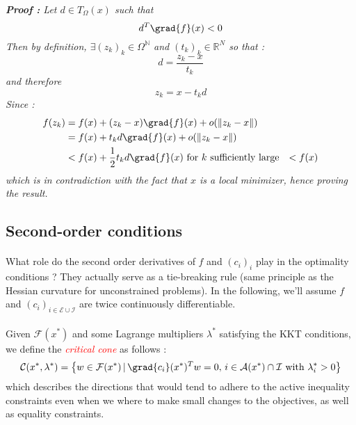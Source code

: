 \documentclass[a4paper]{article}
\begin{document}
{{			\hfill
			\begin{minipage}{0.9\linewidth}
			{
				\it
				\textbf{Proof : } 
				Let $d\in T_\Omega(x)$ such that 
				\begin{equation}
					d^T\grad{f}(x) < 0 
				\end{equation}
				Then by definition, $\exists (z_k)_k\in\Omega^{\mathbb{N}}$ and $(t_k)_k\in\mathbb{R}^N$ so that : 
				\begin{equation}
					d = \frac{z_k-x}{t_k} 
				\end{equation}
				and therefore 
				\begin{equation}
					z_k = x - t_kd 
				\end{equation}
				Since : 
				\begin{equation}
					\begin{aligned}
						f(z_k) &= f(x) + (z_k - x)\grad{f}(x) + o(\lVert z_k -x \rVert) \\
							  &= f(x) + t_kd \grad{f}(x) + o(\lVert z_k -x \rVert) \\
							  &< f(x) + \frac{1}{2} t_kd \grad{f}(x) \text{ for $k$ sufficiently large}
							  &< f(x) 
					\end{aligned}
				\end{equation}
				which is in contradiction with the fact that $x$ is a local minimizer, hence proving the result. 
			}
			\end{minipage}
			
		\subsection{Second-order conditions}
		{
			\paragraph{} What role do the second order derivatives of $f$ and $(c_i)_i$ play in the optimality conditions ? They actually serve as a tie-breaking rule (same principle as the Hessian curvature for unconstrained problems). \newline
			In the following, we'll assume $f$ and $(c_i)_{i\in\mathcal{E}\cup\mathcal{I}}$ are twice continuously differentiable. 
			
			\paragraph{} Given $\mathcal{F}(x^*)$ and some Lagrange multipliers $\lambda^*$ satisfying the KKT conditions, we define the \textcolor{red}{\emph{critical cone}} as follows : 
			\begin{equation}
				\mathcal{C}(x^*,\lambda^*) = \left\{ w \in \mathcal{F}(x^*) \, \vert \, \grad{c_i}(x^*)^Tw = 0, \, i\in\mathcal{A}(x^*)\cap \mathcal{I}\text{ with } \lambda_i^*>0 \right\} 
			\end{equation}
			which describes the directions that would tend to adhere to the active inequality constraints even when we where to make small changes to the objectives, as well as equality constraints. 
			
}}}
\end{document}
